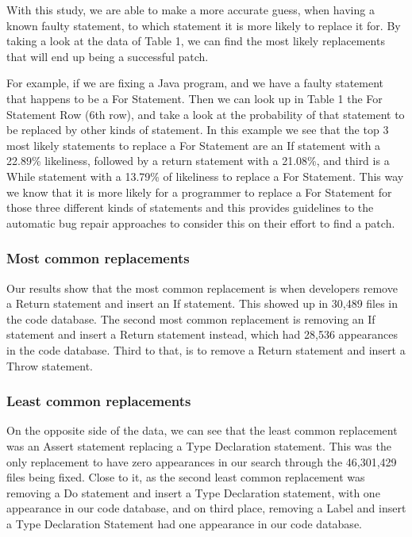 \documentclass{sig-alternate-05-2015}
\begin{document}
With this study, we are able to make a more accurate guess, when having a known faulty statement, to which statement it is more likely to replace it for. By taking a look at the data of Table 1, we can find the most likely replacements that will end up being a successful patch. 

For example, if we are fixing a Java program, and we have a faulty statement that happens to be a For Statement. Then we can look up in Table 1 the For Statement Row (6th row), and take a look at the probability of that statement to be replaced by other kinds of statement. In this example we see that the top 3 most likely statements to replace a For Statement are an If statement with a 22.89\% likeliness, followed by a return statement with a 21.08\%, and third is a While statement with a 13.79\% of likeliness to replace a For Statement. This way we know that it is more likely for a programmer to replace a For Statement for those three different kinds of statements and this provides guidelines to the automatic bug repair approaches to consider this on their effort to find a patch.

\subsubsection{Most common replacements}
Our results show that the most common replacement is when developers remove a Return statement and insert an If statement. This showed up in 30,489 files in the code database. The second most common replacement is removing an If statement and insert a Return statement instead, which had 28,536 appearances in the code database. Third to that, is to remove a Return statement and insert a Throw statement.

\subsubsection{Least common replacements}
On the opposite side of the data, we can see that the least common replacement was an Assert statement replacing a Type Declaration statement. This was the only replacement to have zero appearances in our search through the 46,301,429 files being fixed. Close to it, as the second least common replacement was removing a Do statement and insert a Type Declaration statement, with one appearance in our code database, and on third place, removing a Label and insert a Type Declaration Statement had one appearance in our code database.
\end{document}
